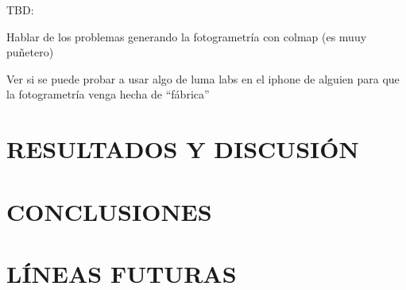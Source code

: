 \documentclass[a4paper, 12pt, spanish, twoside]{article}
\begin{document}
TBD: 

Hablar de los problemas generando la fotogrametría con colmap (es muuy puñetero) 

Ver si se puede probar a usar algo de luma labs en el iphone de alguien para que la fotogrametría venga hecha de “fábrica” 

\clearpage





\newpage
\section{RESULTADOS Y DISCUSIÓN} \label{sec:resultados_y_discusion}

\clearpage





\newpage
\section{CONCLUSIONES} \label{sec:conclusiones}

\clearpage





\newpage
\section{LÍNEAS FUTURAS} \label{sec:lineas_futuras}

\clearpage

\end{document}
